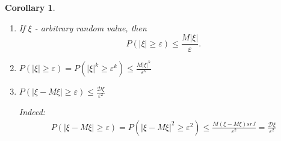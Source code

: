 \documentclass[12pt,letterpaper]{report}
\newtheorem{corollary}[theorem]{Corollary}      %
\begin{document}
\begin{corollary}
    \begin{enumerate}
        \item If $\xi$ - arbitrary random value, then 
            \[
                P(|\xi| \geq \varepsilon) \leq \frac{M|\xi|}{\varepsilon}
            .\] 
        \item $P(|\xi| \geq \varepsilon) = P(|\xi|^k \geq \varepsilon^k) \leq \frac{M|\xi|^k}{\varepsilon^k} $
        \item $P(|\xi - M\xi| \geq \varepsilon) \leq \frac{\mathcal{D}\xi}{\varepsilon^2}$

            Indeed:
            \begin{gather*}
                P(|\xi -M\xi| \geq \varepsilon) = P(|\xi - M\xi|^2 \geq \varepsilon^2) \leq \frac{M(\xi - M\xi)srJ}{\varepsilon^2} = \frac{\mathcal{D}\xi}{\varepsilon^2}
            \end{gather*}
    \end{enumerate}
\end{corollary}
\end{document}
